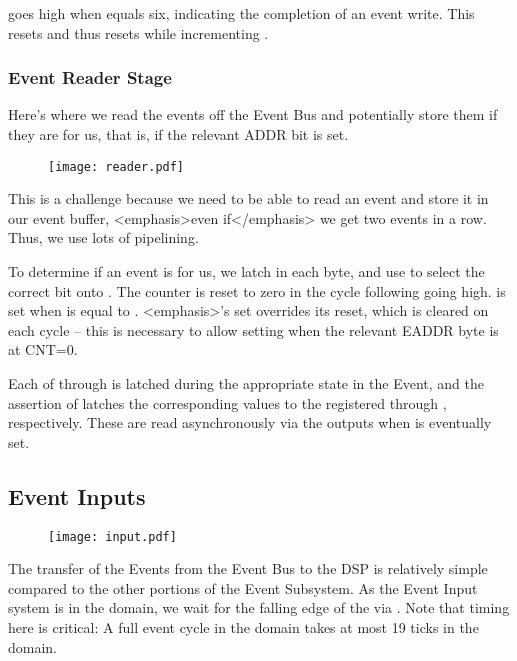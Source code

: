 { goes high when  equals
six, indicating the completion of an event write. This resets
 and thus resets 
while incrementing .  
    

\subsubsection{Event Reader Stage}

Here's where we read the events off the Event Bus and potentially
store them if they are for us, that is, if the relevant ADDR bit is
set.


\begin{figure}[h!]
\texttt{[image: reader.pdf]}
\end{figure}
      
This is a challenge because we need to be able to read an event and
store it in our event buffer, <emphasis>even if</emphasis> we get two
events in a row. Thus, we use lots of pipelining.

To determine if an event is for us, we latch in each
 byte, and use 
to select the correct bit onto . The counter
 is reset to zero in the cycle following
 going high.  is set when
 is equal to .
<emphasis>'s set overrides its reset, which is
cleared on each cycle -- this is necessary to allow setting when the
relevant EADDR byte is at CNT=0. 

Each of  through  is
latched during the appropriate state in the Event, and the assertion
of  latches the corresponding values to the
registered  through
, respectively. These are read
asynchronously via the outputs when  is
eventually set.

\subsection{Event Inputs} 

\begin{figure}[h!]
\texttt{[image: input.pdf]}
\end{figure}

The transfer of the Events from the Event Bus to the DSP is relatively
simple compared to the other portions of the Event Subsystem. As the
Event Input system is in the  domain, we wait
for the falling edge of the  via
. Note that timing here is critical: A full
event cycle in the  domain takes at most 19
ticks in the  domain.
      
}
